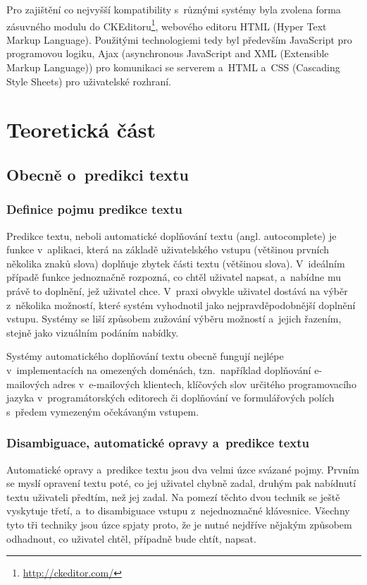 \documentclass[a4paper,11pt,openany]{book} %
\begin{document}
Pro zajištění co nejvyšší kompatibility s~různými systémy byla zvolena forma zásuvného modulu do CKEditoru\footnote{\url{http://ckeditor.com/}}, webového editoru HTML (Hyper Text Markup Language). Použitými technologiemi tedy byl především JavaScript pro programovou logiku, Ajax (asynchronous JavaScript and XML (Extensible Markup Language)) pro komunikaci se serverem a~HTML a~CSS (Cascading Style Sheets) pro uživatelské rozhraní.

\restoregeometry

\part{Teoretická část}
\pagestyle{sensible}

\chapter{Obecně o~predikci textu}

\section{Definice pojmu predikce textu}

Predikce textu, neboli automatické doplňování textu (angl. autocomplete) je funkce v~aplikaci, která na základě uživatelského vstupu (většinou prvních několika znaků slova) doplňuje zbytek části textu (většinou slova). V~ideálním případě funkce jednoznačně rozpozná, co chtěl uživatel napsat, a~nabídne mu právě to doplnění, jež uživatel chce. V~praxi obvykle uživatel dostává na výběr z~několika možností, které systém vyhodnotil jako nejpravděpodobnější doplnění vstupu. Systémy se liší způsobem zužování výběru možností a~jejich řazením, stejně jako vizuálním podáním nabídky.

Systémy automatického doplňování textu obecně fungují nejlépe v~implementacích na omezených doménách, tzn.~například doplňování e-mailových adres v~e-mailových klientech, klíčových slov určitého programovacího jazyka v~programátorských editorech či doplňování ve formulářových polích s~předem vymezeným očekávaným vstupem. 

\section{Disambiguace, automatické opravy a~predikce textu}

Automatické opravy a~predikce textu jsou dva velmi úzce svázané pojmy. Prvním se myslí opravení textu poté, co jej uživatel chybně zadal, druhým pak nabídnutí textu uživateli předtím, než jej zadal. Na pomezí těchto dvou technik se ještě vyskytuje třetí, a~to disambiguace vstupu z~nejednoznačné klávesnice. Všechny tyto tři techniky jsou úzce spjaty proto, že je nutné nejdříve nějakým způsobem odhadnout, co uživatel chtěl, případně bude chtít, napsat.
\end{document}
